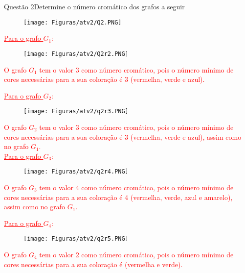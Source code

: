 \documentclass[12pt]{article}
\begin{document}
\newpage
\begin{section}{Questão 2}{Determine o número cromático dos grafos a seguir}\\

\begin{figure}[H]
    \centering
    \texttt{[image: Figuras/atv2/Q2.PNG]}
\end{figure}

\noindent \textcolor{red}{\underline{Para o grafo $G_1$}:}

\begin{figure}[H]
    \centering
    \texttt{[image: Figuras/atv2/Q2r2.PNG]}
\end{figure}

\noindent \textcolor{red}{O grafo $G_1$ tem o valor 3 como número cromático, pois o número mínimo de cores necessárias para a sua coloração é 3 (vermelha, verde e azul).}

\newpage

\noindent \textcolor{red}{ \underline{Para o grafo $G_2$}:}

\begin{figure}[H]
    \centering
    \texttt{[image: Figuras/atv2/q2r3.PNG]}
\end{figure}

\noindent \textcolor{red}{O grafo $G_2$ tem o valor 3 como número cromático, pois o número mínimo de cores necessárias para a sua coloração é 3 (vermelha, verde e azul), assim como no grafo $G_1$.}\\

\noindent \textcolor{red}{\underline{Para o grafo $G_3$}:}

\begin{figure}[H]
    \centering
    \texttt{[image: Figuras/atv2/q2r4.PNG]}
\end{figure}

\noindent \textcolor{red}{O grafo $G_3$ tem o valor 4 como número cromático, pois o número mínimo de cores necessárias para a sua coloração é 4 (vermelha, verde, azul e amarelo), assim como no grafo $G_1$.}

\newpage

\noindent \textcolor{red}{\underline{Para o grafo $G_4$}:}

\begin{figure}[H]
    \centering
    \texttt{[image: Figuras/atv2/q2r5.PNG]}
\end{figure}

\noindent \textcolor{red}{O grafo $G_4$ tem o valor 2 como número cromático, pois o número mínimo de cores necessárias para a sua coloração é  (vermelha e verde).}

\end{section}
\newpage
\end{document}
